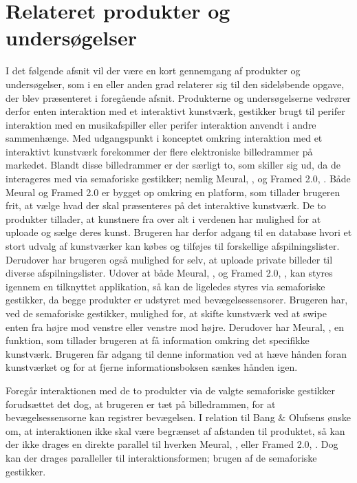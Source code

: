 \section{Relateret produkter og undersøgelser}
\label{RelateretProdukterOgUndersoegelser}
%
I det følgende afsnit vil der være en kort gennemgang af produkter og undersøgelser, som i en eller anden grad relaterer sig til den sideløbende opgave, der blev præsenteret i foregående afsnit. Produkterne og undersøgelserne vedrører derfor enten interaktion med et interaktivt kunstværk, gestikker brugt til perifer interaktion med en musikafspiller eller perifer interaktion anvendt i andre sammenhænge. \blankline
%
Med udgangspunkt i konceptet omkring interaktion med et interaktivt kunstværk forekommer der flere elektroniske billedrammer på markedet. Blandt disse billedrammer er der særligt to, som skiller sig ud, da de interageres med via semaforiske gestikker; nemlig Meural, \parencite{WEB:Meural}, og Framed 2.0, \parencite{WEB:Framed2.0}. Både Meural og Framed 2.0 er bygget op omkring en platform, som tillader brugeren frit, at vælge hvad der skal præsenteres på det interaktive kunstværk. De to produkter tillader, at kunstnere fra over alt i verdenen har mulighed for at uploade og sælge deres kunst. Brugeren har derfor adgang til en database hvori et stort udvalg af kunstværker kan købes og tilføjes til forskellige afspilningslister. Derudover har brugeren også mulighed for selv, at uploade private billeder til diverse afspilningslister. Udover at både Meural, \parencite{WEB:Meural}, og Framed 2.0, \parencite{WEB:Framed2.0}, kan styres igennem en tilknyttet applikation, så kan de ligeledes styres via semaforiske gestikker, da begge produkter er udstyret med bevægelsessensorer. Brugeren har, ved de semaforiske gestikker, mulighed for, at skifte kunstværk ved at swipe enten fra højre mod venstre eller venstre mod højre. Derudover har Meural, \parencite{WEB:Meural}, en funktion, som tillader brugeren at få information omkring det specifikke kunstværk. Brugeren får adgang til denne information ved at hæve hånden foran kunstværket og for at fjerne informationsboksen sænkes hånden igen. 

Foregår interaktionen med de to produkter via de valgte semaforiske gestikker forudsættet det dog, at brugeren er tæt på billedrammen, for at bevægelsessensorne kan registrer bevægelsen. I relation til Bang $\&$ Olufsens ønske om, at interaktionen ikke skal være begrænset af afstanden til produktet, så kan der ikke drages en direkte parallel til hverken Meural, \parencite{WEB:Meural}, eller Framed 2.0, \parencite{WEB:Framed2.0}. Dog kan der drages paralleller til interaktionsformen; brugen af de semaforiske gestikker.\blankline
%
              


